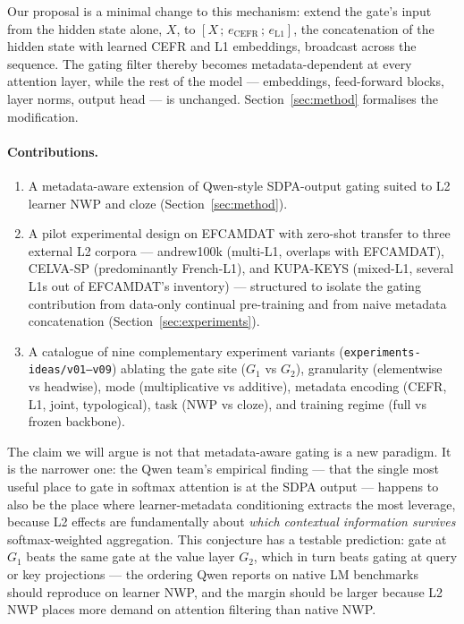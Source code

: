 Our proposal is a minimal change to this mechanism: extend the gate's
input from the hidden state alone, $X$, to $[X\,;\,e_\text{CEFR}\,;\,e_\text{L1}]$,
the concatenation of the hidden state with learned CEFR and L1
embeddings, broadcast across the sequence. The gating filter thereby
becomes metadata-dependent at every attention layer, while the rest of
the model --- embeddings, feed-forward blocks, layer norms, output head
--- is unchanged. Section~\ref{sec:method} formalises the modification.

\paragraph{Contributions.}
\begin{enumerate}
  \item A metadata-aware extension of Qwen-style SDPA-output gating
    suited to L2 learner NWP and cloze (Section~\ref{sec:method}).
  \item A pilot experimental design on EFCAMDAT with zero-shot transfer
    to three external L2 corpora --- andrew100k (multi-L1, overlaps
    with EFCAMDAT), CELVA-SP (predominantly French-L1), and KUPA-KEYS
    (mixed-L1, several L1s out of EFCAMDAT's inventory) --- structured to isolate the gating
    contribution from data-only continual pre-training and from naive
    metadata concatenation (Section~\ref{sec:experiments}).
  \item A catalogue of nine complementary experiment variants
    (\texttt{experiments-ideas/v01--v09}) ablating the gate site
    ($G_1$ vs $G_2$), granularity (elementwise vs headwise), mode
    (multiplicative vs additive), metadata encoding (CEFR, L1, joint,
    typological), task (NWP vs cloze), and training regime (full vs
    frozen backbone).
\end{enumerate}

The claim we will argue is not that metadata-aware gating is a new
paradigm. It is the narrower one: the Qwen team's empirical finding ---
that the single most useful place to gate in softmax attention is at the
SDPA output --- happens to also be the place where learner-metadata
conditioning extracts the most leverage, because L2 effects are
fundamentally about \emph{which contextual information survives}
softmax-weighted aggregation. This conjecture has a testable prediction:
gate at $G_1$ beats the same gate at the value layer $G_2$, which in
turn beats gating at query or key projections --- the ordering Qwen
reports on native LM benchmarks should reproduce on learner NWP, and
the margin should be larger because L2 NWP places more demand on
attention filtering than native NWP.
